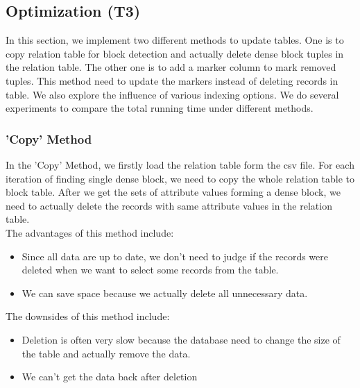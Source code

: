 \subsection{Optimization (T3)}
In this section, we implement two different methods to update tables. One is to copy relation table for block detection and actually delete dense block tuples in the relation table. The other one is to add a marker column to mark removed tuples. This method need to update the markers instead of deleting records in table. We also explore the influence of various indexing options. We do several experiments to compare the total running time under different methods.
\subsubsection{'Copy' Method}
In the 'Copy' Method, we firstly load the relation table form the csv file. For each iteration of finding single dense block, we need to copy the whole relation table to block table. After we get the sets of attribute values forming a dense block, we need to actually delete the records with same attribute values in the relation table. \\
The advantages of this method include: 
\begin{itemize}
    \item Since all data are up to date, we don't need to judge if the records were deleted when we want to select some records from the table.
    \item We can save space because we actually delete all unnecessary data.
\end{itemize}
The downsides of this method include:
\begin{itemize}
    \item Deletion is often very slow because the database need to change the size of the table and actually remove the data.
    \item We can't get the data back after deletion
\end{itemize}
 
